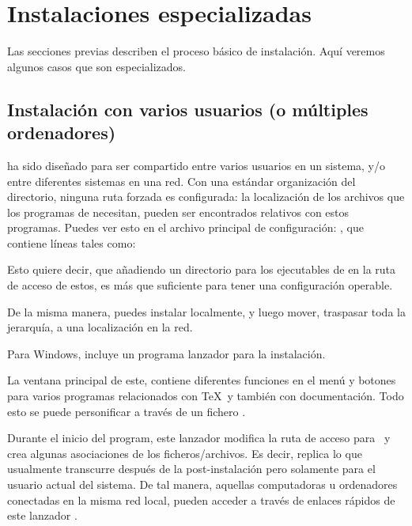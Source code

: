 \documentclass{article}
\begin{document}
\section{Instalaciones especializadas}

Las secciones previas describen el proceso básico de instalación. Aquí
veremos algunos casos que son especializados. 

\subsection{Instalación con varios usuarios (o múltiples ordenadores)}
\label{sec:sharedinstall}

\TL{} ha sido diseñado para ser compartido entre varios
usuarios en un sistema, y/o entre diferentes sistemas en una
red. Con una estándar organización del directorio, ninguna
ruta forzada es configurada: la localización de los archivos
que los programas de \TL{} necesitan, pueden ser encontrados
relativos con estos programas. Puedes ver esto en el archivo
principal de configuración:
, que contiene líneas tales como:
Esto quiere decir, que añadiendo un directorio para los ejecutables de
\TL{} en la ruta de acceso de estos, es más que suficiente para
tener una configuración operable. 

De la misma manera, puedes instalar \TL{} localmente, y
luego mover, traspasar toda la jerarquía, a una localización
en la red. 

Para Windows, \TL{} incluye un programa lanzador  para la instalación.

La ventana principal de este, contiene diferentes funciones en el menú y
botones para varios programas relacionados con \TeX\ y también con
documentación. Todo esto se puede personificar a través de un fichero .

Durante el inicio del program, este lanzador modifica la ruta de acceso para
\TL\ y crea algunas asociaciones de los ficheros/archivos. Es decir, replica lo
que usualmente transcurre después de la post-instalación pero solamente para el
usuario actual del sistema. De tal manera, aquellas computadoras u ordenadores
conectadas en la misma red local, pueden acceder \TL{} a través de enlaces
rápidos de este lanzador . 
\end{document}
